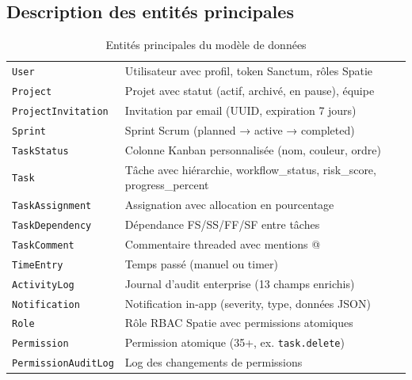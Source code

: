 \subsection{Description des entités principales}

\begin{table}[H]
  \centering
  \caption{Entités principales du modèle de données}
  \label{tab:entites}
  \begin{tabularx}{\textwidth}{L{4cm}X}
    \toprule
     &  \\
    \midrule
    \texttt{User}               & Utilisateur avec profil, token Sanctum, rôles Spatie \\
    \texttt{Project}            & Projet avec statut (actif, archivé, en pause), équipe \\
    \texttt{ProjectInvitation}  & Invitation par email (UUID, expiration 7 jours) \\
    \texttt{Sprint}             & Sprint Scrum (planned → active → completed) \\
    \texttt{TaskStatus}         & Colonne Kanban personnalisée (nom, couleur, ordre) \\
    \texttt{Task}               & Tâche avec hiérarchie, workflow\_status, risk\_score,
                                  progress\_percent \\
    \texttt{TaskAssignment}     & Assignation avec allocation en pourcentage \\
    \texttt{TaskDependency}     & Dépendance FS/SS/FF/SF entre tâches \\
    \texttt{TaskComment}        & Commentaire threaded avec mentions @ \\
    \texttt{TimeEntry}          & Temps passé (manuel ou timer) \\
    \texttt{ActivityLog}        & Journal d'audit enterprise (13 champs enrichis) \\
    \texttt{Notification}       & Notification in-app (severity, type, données JSON) \\
    \texttt{Role}               & Rôle RBAC Spatie avec permissions atomiques \\
    \texttt{Permission}         & Permission atomique (35+, ex. \texttt{task.delete}) \\
    \texttt{PermissionAuditLog} & Log des changements de permissions \\

\end{tabularx}
\end{table}
